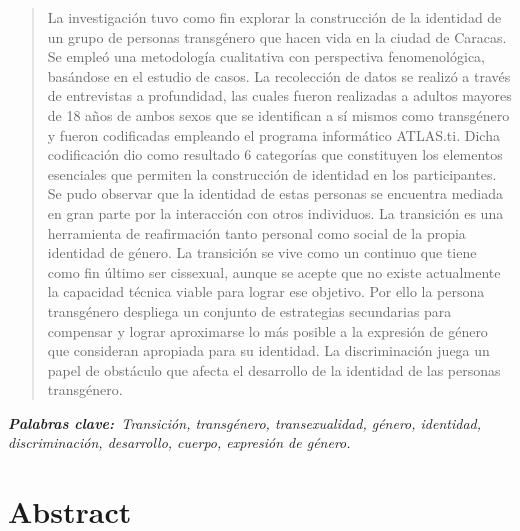 \begin{quote}
\small
La investigación tuvo como fin explorar la construcción de la identidad de un
grupo de personas transgénero que hacen vida en la ciudad de Caracas. Se empleó
una metodología cualitativa con perspectiva fenomenológica, basándose en el
estudio de casos. La recolección de datos se realizó a través de entrevistas a
profundidad, las cuales fueron realizadas a adultos mayores de 18 años de ambos
sexos que se identifican a sí mismos como transgénero y fueron codificadas
empleando el programa informático ATLAS.ti\@. Dicha codificación dio como
resultado 6 categorías que constituyen los elementos esenciales que permiten la
construcción de identidad en los participantes. Se pudo observar que la
identidad de estas personas se encuentra mediada en gran parte por la
interacción con otros individuos. La transición es una herramienta de
reafirmación tanto personal como social de la propia identidad de género. La
transición se vive como un continuo que tiene como fin último ser cissexual,
aunque se acepte que no existe actualmente la capacidad técnica viable para
lograr ese objetivo. Por ello la persona transgénero despliega un conjunto de
estrategias secundarias para compensar y lograr aproximarse lo más posible a la
expresión de género que consideran apropiada para su identidad. La
discriminación juega un papel de obstáculo que afecta el desarrollo de la
identidad de las personas transgénero.
\end{quote}

\itshape\textbf{Palabras clave:}\normalfont{}\ Transición, transgénero,
transexualidad, género, identidad, discriminación, desarrollo, cuerpo,
expresión de género.

\chapter{Abstract}

\begin{center}
	\large\scshape\theengtitle\
\end{center}

